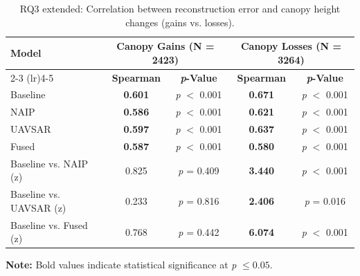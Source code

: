 \documentclass[12pt]{report}
\begin{document}
\begin{table}[H]
\centering
\caption{RQ3 extended: Correlation between reconstruction error and canopy height changes (gains vs. losses).}
\small
\begin{tabular}{lcccc}
\toprule
\multirow{2.35}{*}{\textbf{Model}} & \multicolumn{2}{c}{\textbf{Canopy Gains (N = 2423)}} & \multicolumn{2}{c}{\textbf{Canopy Losses (N = 3264)}} \\
\cmidrule(lr){2-3} \cmidrule(lr){4-5}
 & \textbf{Spearman \boldmath{$\rho$}} & \textbf{\emph{p}-Value} & \textbf{Spearman \boldmath{$\rho$}} & \textbf{\emph{p}-Value} \\
\midrule
Baseline & \textbf{0.601} & \emph{p} $<$ 0.001 & \textbf{0.671} & \emph{p} $<$ 0.001 \\
NAIP & \textbf{0.586} & \emph{p} $<$ 0.001 & \textbf{0.621} & \emph{p} $<$ 0.001 \\
UAVSAR & \textbf{0.597} & \emph{p} $<$ 0.001 & \textbf{0.637} & \emph{p} $<$ 0.001 \\
Fused & \textbf{0.587} & \emph{p} $<$ 0.001 & \textbf{0.580} & \emph{p} $<$ 0.001 \\
\midrule
Baseline vs. NAIP (z) & 0.825 & \emph{p} = 0.409 & \textbf{3.440} & \emph{p} $<$ 0.001 \\
Baseline vs. UAVSAR (z) & 0.233 & \emph{p} = 0.816 & \textbf{2.406} & \emph{p} = 0.016 \\
Baseline vs. Fused (z) & 0.768 & \emph{p} = 0.442 & \textbf{6.074} & \emph{p} $<$ 0.001 \\
\bottomrule
\end{tabular}
\label{tab:rq3_extended_results}

\vspace{2pt}
\footnotesize\textbf{Note:} Bold values indicate statistical significance at \emph{p} $\leq 0.05$.
\end{table}
\vspace{-3pt}
\end{document}
